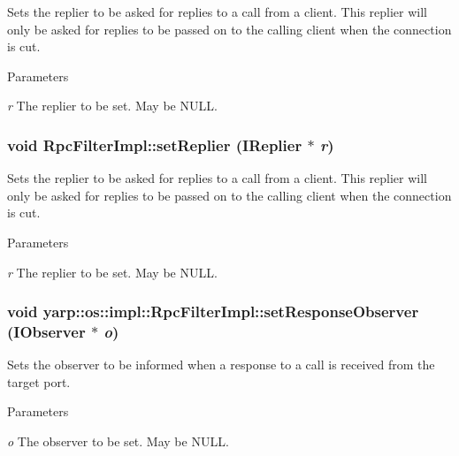 \label{classyarp_1_1os_1_1impl_1_1_rpc_filter_impl_aecdd28fdc2cefb6e387b10aeeae47a2d}
Sets the replier to be asked for replies to a call from a client. This replier will only be asked for replies to be passed on to the calling client when the connection is cut. 
\begin{DoxyParams}{Parameters}
\item[{\em r}]The replier to be set. May be {\ttfamily NULL}. \end{DoxyParams}
\hypertarget{classyarp_1_1os_1_1impl_1_1_rpc_filter_impl_aa7595e915624ac4c6126919c00761a23}{
\subsubsection[{setReplier}]{\setlength{\rightskip}{0pt plus 5cm}void RpcFilterImpl::setReplier ({\bf IReplier} $\ast$ {\em r})}}
\label{classyarp_1_1os_1_1impl_1_1_rpc_filter_impl_aa7595e915624ac4c6126919c00761a23}
Sets the replier to be asked for replies to a call from a client. This replier will only be asked for replies to be passed on to the calling client when the connection is cut. 
\begin{DoxyParams}{Parameters}
\item[{\em r}]The replier to be set. May be {\ttfamily NULL}. \end{DoxyParams}
\hypertarget{classyarp_1_1os_1_1impl_1_1_rpc_filter_impl_a7ab74acd4a4e69fce8fed0d54741bdc2}{
\subsubsection[{setResponseObserver}]{\setlength{\rightskip}{0pt plus 5cm}void yarp::os::impl::RpcFilterImpl::setResponseObserver ({\bf IObserver} $\ast$ {\em o})}}
\label{classyarp_1_1os_1_1impl_1_1_rpc_filter_impl_a7ab74acd4a4e69fce8fed0d54741bdc2}
Sets the observer to be informed when a response to a call is received from the target port. 
\begin{DoxyParams}{Parameters}
\item[{\em o}]The observer to be set. May be {\ttfamily NULL}. \end{DoxyParams}
